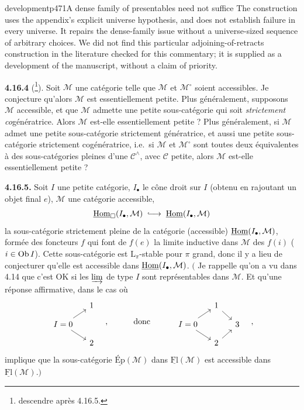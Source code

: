 \begin{dcomment}{development}{p471}{A dense family of presentables need not suffice}
The construction uses the appendix's explicit universe hypothesis, and does not establish failure in every universe. It repairs the dense-family issue without a universe-sized sequence of arbitrary choices. We did not find this particular adjoining-of-retracts construction in the literature checked for this commentary; it is supplied as a development of the manuscript, without a claim of priority.
\end{dcomment}


\textbf{4.16.4} (\footnote[194]{descendre après 4.16.5.}). Soit $\mathcal{M}$ une catégorie telle que $\mathcal{M}$ et $\mathcal{M}^\circ$ soient accessibles. Je conjecture qu'alors $\mathcal{M}$ est essentiellement petite. Plus généralement, supposons $\mathcal{M}$ accessible, et que $\mathcal{M}$ admette une petite sous-catégorie qui soit \textit{strictement co}génératrice. Alors $\mathcal{M}$ est-elle essentiellement petite ? Plus généralement, si $\mathcal{M}$ admet une petite sous-catégorie strictement génératrice, et aussi une petite sous-catégorie strictement cogénératrice, i.e.\ si $\mathcal{M}$ et $\mathcal{M}^\circ$ sont toutes deux équivalentes à des sous-catégories pleines d'une $\mathcal{C}^\wedge$, avec $\mathcal{C}$ petite, alors $\mathcal{M}$ est-elle essentiellement petite ?

\textbf{4.16.5.} Soit $I$ une petite catégorie, $I_\bullet$ le cône droit sur $I$ (obtenu en rajoutant un objet final $e$), $\mathcal{M}$ une catégorie accessible,
\[
\underline{\Hom}_{\square}(I_\bullet,\mathcal{M}) \;\into\; \underline{\Hom}(I_\bullet,\mathcal{M})
\]
la sous-catégorie strictement pleine de la catégorie (accessible) $\underline{\operatorname{Hom}}(I_\bullet,\mathcal{M})$, formée des foncteurs $f$ qui font de $f(e)$ la limite inductive dans $\mathcal{M}$ des $f(i)$ ($i \in \operatorname{Ob} I$). Cette sous-catégorie est $\mathrm{L}_\pi$-stable pour $\pi$ grand, donc il y a lieu
de conjecturer qu'elle est accessible dans $\underline{\operatorname{Hom}}(I_\bullet,\mathcal{M})$. $\Big($ Je rappelle qu'on a vu dans 4.14 que c'est OK si les $\varinjlim$ de type $I$ sont représentables dans $\mathcal{M}$. Et qu'une réponse affirmative, dans le cas où
\[
\begin{tikzcd}[row sep=small, column sep=small]
 & 1 \\
I = 0 \arrow[ur] \arrow[dr] & \\
 & 2
\end{tikzcd}
\quad ,\qquad\quad \text{donc} \qquad\quad
\begin{tikzcd}[row sep=small, column sep=small]
 & 1 \arrow[dr] & \\
I = 0 \arrow[ur] \arrow[dr] & & 3 \\
 & 2 \arrow[ur] &
\end{tikzcd}
\quad ,
\]
implique que la sous-catégorie $\underline{\text{Ép}}(\mathcal{M})$ dans $\underline{\mathrm{Fl}}(\mathcal{M})$ est accessible dans $\underline{\mathrm{Fl}}(\mathcal{M})$.$\Big)$

